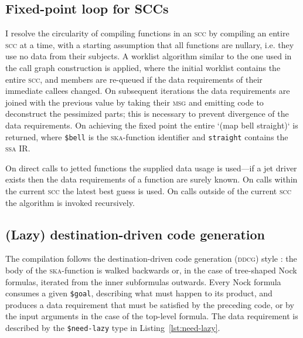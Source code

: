 \documentclass[twoside]{article}
\begin{document}
\subsection[{Fixed-point loop for \textsc{scc}s}]{Fixed-point loop for SCCs}

I resolve the circularity of compiling functions in an \textsc{scc} by compiling an entire \textsc{scc} at a time, with a starting assumption that all functions are nullary, i.e. they use no data from their subjects. A worklist algorithm similar to the one used in the call graph construction is applied, where the initial worklist contains the entire \textsc{scc}, and members are re-queued if the data requirements of their immediate callees changed. On subsequent iterations the data requirements are joined with the previous value by taking their \textsc{msg} and emitting code to deconstruct the pessimized parts; this is necessary to prevent divergence of the data requirements. On achieving the fixed point the entire `(map bell straight)` is returned, where \lstinline[style=inlinecode]{$bell} is the \textsc{ska}-function identifier and \lstinline[style=inlinecode]{straight} contains the \textsc{ssa} IR.

On direct calls to jetted functions the supplied data usage is used---if a jet driver exists then the data requirements of a function are surely known. On calls within the current \textsc{scc} the latest best guess is used. On calls outside of the current \textsc{scc} the algorithm is invoked recursively.

\subsection{(Lazy) destination-driven code generation}

The compilation follows the destination-driven code generation (\textsc{ddcg}) style \citep{ddcg}: the body of the \textsc{ska}-function is walked backwards or, in the case of tree-shaped Nock formulas, iterated from the inner subformulas outwards. Every Nock formula consumes a given \lstinline[style=inlinecode]{$goal}, describing what must happen to its product, and produces a data requirement that must be satisfied by the preceding code, or by the input arguments in the case of the top-level formula. The data requirement is described by the \lstinline[style=inlinecode]{$need-lazy} type in Listing~\ref{lst:need-lazy}.
\end{document}
